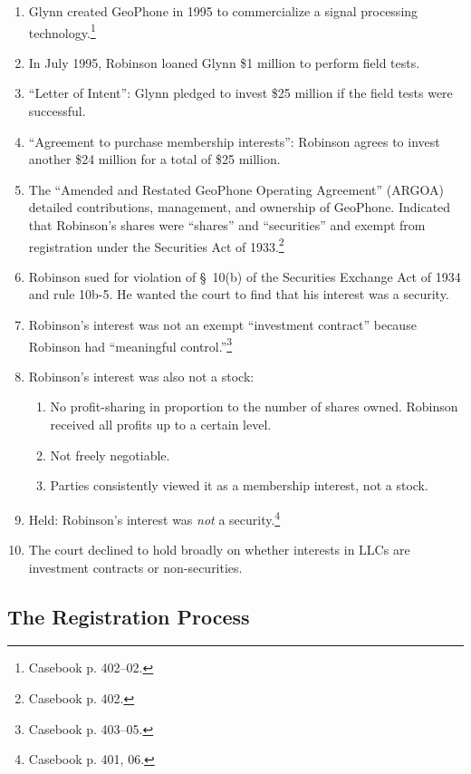 \begin{enumerate}
    \item Glynn created GeoPhone in 1995 to commercialize a signal processing 
    technology.\footnote{Casebook p. 402--02.}
    \item In July 1995, Robinson loaned Glynn \$1 million to perform field 
    tests.
    \item ``Letter of Intent'': Glynn pledged to invest \$25 million if the 
    field tests were successful.
    \item ``Agreement to purchase membership interests'': Robinson agrees to 
    invest another \$24 million for a total of \$25 million.
    \item The ``Amended and Restated GeoPhone Operating Agreement'' (ARGOA) 
    detailed contributions, management, and ownership of GeoPhone. Indicated 
    that Robinson's shares were ``shares'' and ``securities'' and exempt from 
    registration under the Securities Act of 1933.\footnote{Casebook p. 402.}
    \item Robinson sued for violation of \S\ 10(b) of the Securities Exchange 
    Act of 1934 and rule 10b-5. He wanted the court to find that his interest 
    was a security.
    \item Robinson's interest was not an exempt ``investment contract'' because 
    Robinson had ``meaningful control.''\footnote{Casebook p. 403--05.}
    \item Robinson's interest was also not a stock:
    \begin{enumerate}
        \item No profit-sharing in proportion to the number of shares owned. 
        Robinson received all profits up to a certain level.
        \item Not freely negotiable.
        \item Parties consistently viewed it as a membership interest, not a 
        stock.
    \end{enumerate}
    \item Held: Robinson's interest was \emph{not} a 
    security.\footnote{Casebook p. 401, 06.}
    \item The court declined to hold broadly on whether interests in LLCs are 
    investment contracts or non-securities.
\end{enumerate}

\subsection{The Registration Process}

